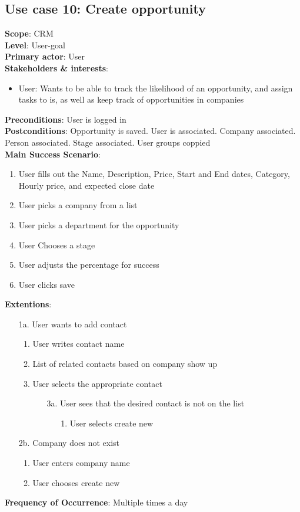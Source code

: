 \subsection{Use case 10: Create opportunity}
\textbf{Scope}: CRM \\
\textbf{Level}: User-goal \\
\textbf{Primary actor}: User \\
\textbf{Stakeholders \& interests}:
\begin{itemize}
  \item User: Wants to be able to track the likelihood of an opportunity, and assign tasks to is, as well as keep track of opportunities in companies
\end{itemize}
\textbf{Preconditions}: User is logged in \\
\textbf{Postconditions}: Opportunity is saved. User is associated. Company associated. Person associated. Stage associated. User groups coppied\\
\textbf{Main Success Scenario}:
\begin{enumerate}
  \item User fills out the Name, Description, Price, Start and End dates, Category, Hourly price, and expected close date
  \item User picks a company from a list
  \item User picks a department for the opportunity
  \item User Chooses a stage
  \item User adjusts the percentage for success
  \item User clicks save
\end{enumerate}
\textbf{Extentions}:
\begin{itemize}
  \item [1a.] User wants to add contact
  \begin{enumerate}
    \item User writes contact name
    \item List of related contacts based on company show up
    \item User selects the appropriate contact
    \begin{itemize}
      \item [3a.] User sees that the desired contact is not on the list
      \begin{enumerate}
        \item [1.] User selects create new
      \end{enumerate}
    \end{itemize}
  \end{enumerate}
  \item [2b.] Company does not exist
  \begin{enumerate}
    \item User enters company name
    \item User chooses create new
  \end{enumerate}
\end{itemize}
\textbf{Frequency of Occurrence}: Multiple times a day


